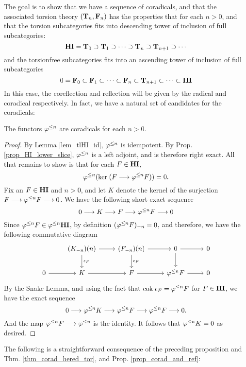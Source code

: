 The goal is to show that we have a sequence of coradicals, and
that the associated torsion theory $(\TCat{n}, \TFCat{n})$ has
the properties that for each $n > 0$, and that the torsion 
subcategories fits into descending tower of inclusion of full 
subcategories:
\[
\HI = \TCat{0} \supset \TCat{1} \supset \cdots \supset \TCat{n} 
   \supset \TCat{n + 1} \supset \cdots
\]
and the torsionfree subcategories fits into an ascending tower
of inclusion of full subcategories
\[
0 = \TFCat{0} \subset \TFCat{1} \subset \cdots \subset \TFCat{n}
   \subset \TCat{n + 1} \subset \cdots \subset \HI
\]
In this case, the coreflection and reflection will be given by
the radical and coradical respectively. In fact, we have a
natural set of candidates for the coradicals:

\begin{prop}
The functors $\tlHI{n}$ are coradicals for each $n > 0$.
\end{prop}
\begin{proof}
By Lemma \ref{lem_tlHI_id}, $\tlHI{n}$ is idempotent. By Prop. 
\ref{prop_HI_lower_slice}, $\tlHI{n}$ is a left adjoint, and
is therefore right exact. All that remains to show is that for
each $F \in \HI$,
\[
\tlHI{n}(\ker (F \to \tlHI{n} F)) = 0.
\]
Fix an $F \in \HI$ and $n > 0$, and let $K$ denote the kernel of 
the surjection $F \to \tlHI{n}F \to 0$. We have the following
short exact sequence 
\[
0 \to K \to F \to \tlHI{n} F \to 0
\]
Since $\tlHI{n} F \in \tlHI{n}\HI$, by definition 
$\RHI[n]{(\tlHI{n} F)} = 0$, and therefore, we have the following
commutative diagram
\[
\begin{tikzcd}
{} &\LHI[n]{(\RHI[n]{K})} \arrow{d}{\cuHI_F} \arrow{r}
   &\LHI[n]{(\RHI[n]{F})} \arrow{d}{\cuHI_F} \arrow{r}
   &0 \arrow{d} \arrow{r}
   &0 \\
0 \arrow{r} &
  K \arrow{r}&
  F \arrow{r}&
  \tlHI{n}F \arrow{r}&
  0
\end{tikzcd}
\]
By the Snake Lemma, and using the fact that $\cok \cuHI_F = 
\tlHI{n} F$ for $F \in \HI$, we have the exact sequence
\[
0 \to \tlHI{n}K \to \tlHI{n}F \to \tlHI{n} F \to 0.
\]
And the map $\tlHI{n}F \to \tlHI{n}$ is the identity. It follows 
that $\tlHI{n} K = 0$ as desired.
\end{proof}

The following is a straightforward consequence of the preceding 
proposition and Thm. \ref{thm_corad_hered_tor}, and Prop.
\ref{prop_corad_and_ref}:

